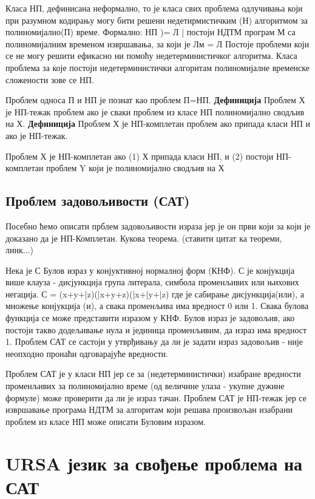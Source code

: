 \documentclass[12pt,oneside]{memoir}
\begin{document}
Класа НП, дефинисана неформално, то је класа свих проблема одлучивања који при разумном кодирању могу бити решени недетирмистичким (Н) алгоритмом за полиномијално(П) време. Формално:
НП )= { Л | постоји НДТМ програм М са полиномијалним временом извршавања, за који је Лм = Л}
Постоје проблеми који се не могу решити ефикасно ни помоћу недетерминистичког алгоритма. Класа проблема за које постоји недетерминистички алгоритам полиномијалне временске сложености зове се НП.

Проблем односа П и НП је познат као проблем П=НП. 
\textbf{Дефиниција} Проблем Х је НП-тежак проблем ако је сваки проблем из класе НП полиномијално сводљив на Х.
\textbf{Дефиниција} Проблем Х је НП-комплетан проблем ако припада класи НП и ако је НП-тежак.

Проблем Х је НП-комплетан ако (1) Х припада класи НП, и (2) постоји НП-комплетан проблем Y који је полиномијално сводљив на Х

\subsection{Проблем задовољивости (САТ) }
Посебно ћемо описати прблем задовољивости израза јер је он први који за који је доказано да је НП-Комплетан. Кукова теорема. (ставити цитат ка теореми, линк...)

Нека је С Булов израз у конјуктивној нормалној форм (КНФ). С је конјукција више клауза - дисјункција група литерала, симбола променљивих или њихових негација.
С = (x+y+|z)(|x+y+z)(|x+|y+|z) где је сабирање дисјункција(или), а множење конјукција (и), а свака променљива има вредност 0 или 1.  Свака булова функција се може представити изразом у КНФ. Булов израз је задовољив, ако постоји такво додељивање нула и јединица променљивим, да израз има вредност 1. Проблем САТ се састоји у утврђивању да ли је задати израз задовољив - није неопходно пронаћи одговарајуће вредности.

Проблем САТ је у класи НП јер се за (недетерминистички) изабране вредности променљивих за полиномијално време (од величине улаза - укупне дужине формуле) може проверити да ли је израз тачан. Проблем САТ је НП-тежак јер се извршавање програма НДТМ за алгоритам који решава произвољан изабрани проблем из класе НП може описати Буловим изразом.

\section{URSA језик за свођење проблема на САТ}
\end{document}
